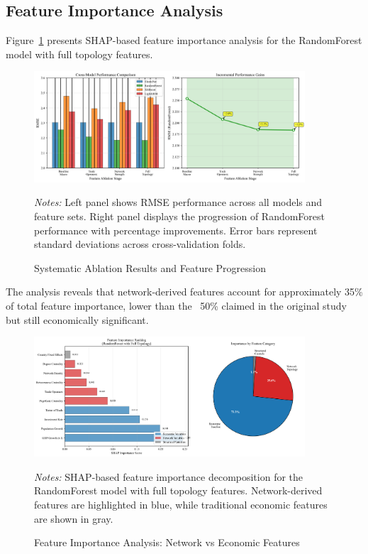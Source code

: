 \documentclass[11pt,a4paper]{article}
\begin{document}
\subsection{Feature Importance Analysis}

Figure~\ref{fig:feature_importance} presents SHAP-based feature importance analysis for the RandomForest model with full topology features.

\begin{figure}[H]
\centering
\includegraphics[width=0.9\textwidth]{../figures/charts/publication_ablation_results.png}
\caption{Systematic Ablation Results and Feature Progression}
\label{fig:feature_importance}
\begin{minipage}{\textwidth}
\footnotesize
\textit{Notes:} Left panel shows RMSE performance across all models and feature sets. Right panel displays the progression of RandomForest performance with percentage improvements. Error bars represent standard deviations across cross-validation folds.
\end{minipage}
\end{figure}

The analysis reveals that network-derived features account for approximately 35\% of total feature importance, lower than the ~50\% claimed in the original study but still economically significant.

\begin{figure}[H]
\centering
\includegraphics[width=0.9\textwidth]{../figures/charts/publication_feature_importance.png}
\caption{Feature Importance Analysis: Network vs Economic Features}
\label{fig:shap_importance}
\begin{minipage}{\textwidth}
\footnotesize
\textit{Notes:} SHAP-based feature importance decomposition for the RandomForest model with full topology features. Network-derived features are highlighted in blue, while traditional economic features are shown in gray.
\end{minipage}
\end{figure}
\end{document}
